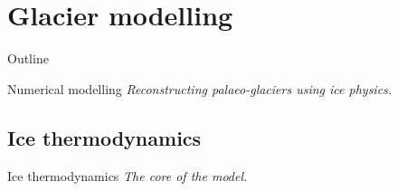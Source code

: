 


\section{Glacier modelling}

    \begin{sectionframe}{Outline}
      \begin{multicols}{2}
        \tableofcontents
      \end{multicols}
    \end{sectionframe}

    \begin{sectionframe}{Numerical modelling}
      \emph{Reconstructing palaeo-glaciers using ice physics.}
    \end{sectionframe}


\subsection{Ice thermodynamics}

    \begin{sectionframe}{Ice thermodynamics}
      \emph{The core of the model.}
    \end{sectionframe}



